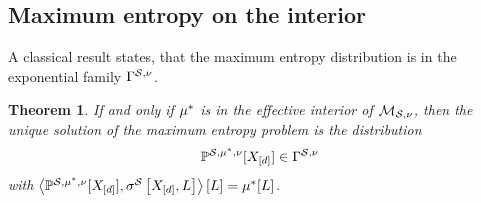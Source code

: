 \documentclass[aps,onecolumn,nofootinbib,pra]{article}
\newtheorem{theorem}{Theorem}
\begin{document}
    \subsection{Maximum entropy on the interior}

    A classical result states, that the maximum entropy distribution is in the exponential family $\Gamma^{\mathcal{S},\nu}$.

    \begin{theorem} %
        \label{the:maxEntropyInterior}
        If and only if $\mu^*$ is in the effective interior of $\mathcal{M}_{\mathcal{S},\nu}$, then the unique solution of the maximum entropy problem is the distribution
        \begin{align*}
            \mathbb{P}^{\mathcal{S},\mu^*,\nu}[X_{[d]}]\in\Gamma^{\mathcal{S},\nu}
        \end{align*}
        with $\left\langle \mathbb{P}^{\mathcal{S},\mu^*,\nu}[X_{[d]}],\sigma^{\mathcal{S}}\left[X_{[d]},L\right]\right\rangle \left[ L \right]=\mu^*[L]$.
    \end{theorem}
\end{document}
